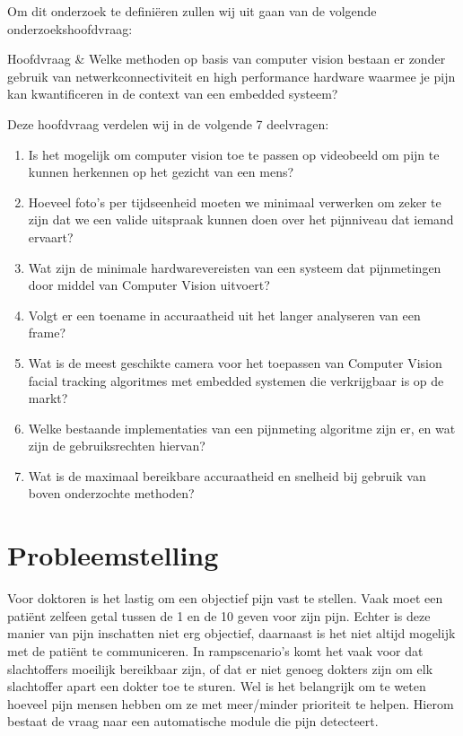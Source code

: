 \documentclass[11pt]{article}
\begin{document}
    Om dit onderzoek te defini\"{e}ren zullen wij uit gaan van de volgende onderzoekshoofdvraag:\\

    \begin{definition}
        Hoofdvraag & Welke methoden op basis van computer vision bestaan er zonder gebruik van netwerkconnectiviteit en high performance hardware waarmee je pijn kan kwantificeren in de context van een embedded systeem?
    \end{definition}


    \bigskip

    Deze hoofdvraag verdelen wij in de volgende 7 deelvragen:

    \begin{enumerate}
        \item\label{itm:dv1} Is het mogelijk om computer vision toe te passen op videobeeld om pijn te kunnen herkennen op het gezicht van een mens?
        \item\label{itm:dv2} Hoeveel foto's per tijdseenheid moeten we minimaal verwerken om zeker te zijn dat we een valide uitspraak kunnen doen over het pijnniveau dat iemand ervaart?
        \item\label{itm:dv3} Wat zijn de minimale hardwarevereisten van een systeem dat pijnmetingen door middel van Computer Vision uitvoert?
        \item\label{itm:dv4} Volgt er een toename in accuraatheid uit het langer analyseren van een frame?
        \item\label{itm:dv5} Wat is de meest geschikte camera voor het toepassen van Computer Vision facial tracking algoritmes met embedded systemen die verkrijgbaar is op de markt?
        \item\label{itm:dv6} Welke bestaande implementaties van een pijnmeting algoritme zijn er, en wat zijn de gebruiksrechten hiervan?
        \item\label{itm:dv7} Wat is de maximaal bereikbare accuraatheid en snelheid bij gebruik van boven onderzochte methoden?
    \end{enumerate}


    \section{Probleemstelling}\label{sec:probleemstelling}
    Voor doktoren is het lastig om een objectief pijn vast te stellen.
    Vaak moet een pati\"{e}nt zelfeen getal tussen de 1 en de 10 geven voor zijn pijn.
    Echter is deze manier van pijn inschatten niet erg objectief, daarnaast is het niet
    altijd mogelijk met de pati\"{e}nt te communiceren.
    In rampscenario's komt het vaak voor dat slachtoffers moeilijk bereikbaar zijn, of dat er niet genoeg dokters zijn om elk slachtoffer apart een dokter toe te sturen.
    Wel is het belangrijk om te weten hoeveel pijn mensen hebben om ze met meer/minder prioriteit te helpen.
    Hierom bestaat de vraag naar een automatische module die pijn detecteert.
\end{document}
